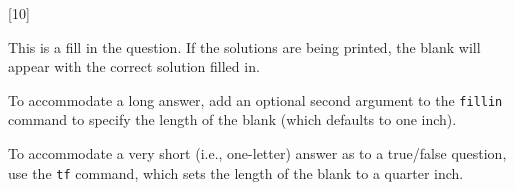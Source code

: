 [10]

This is a fill in the \fillin[blank] question. If the solutions are being
printed, the blank will appear with the correct solution filled in.

To accommodate a long answer, add an optional second argument to the
\texttt{fillin} command to specify the length of the blank (which defaults to
one inch).

To accommodate a very short (i.e., one-letter) answer as to a true/false
question, use the \texttt{tf} command, which sets the length of the blank to a
quarter inch.
